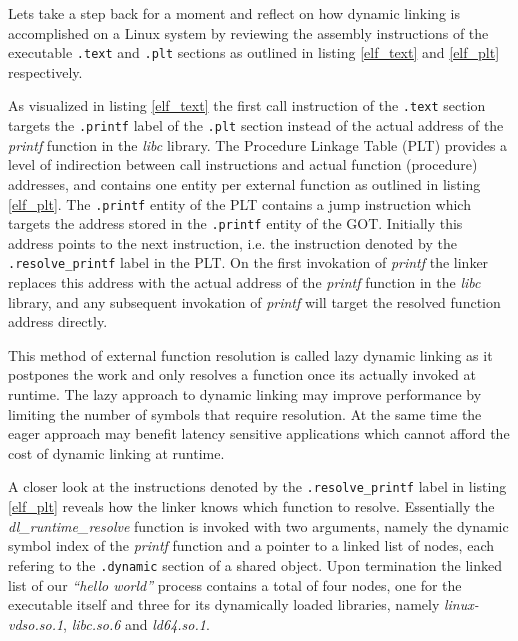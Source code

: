 \documentclass[12pt, a4paper]{article}
\begin{document}
Lets take a step back for a moment and reflect on how dynamic linking is accomplished on a Linux system by reviewing the assembly instructions of the executable \texttt{.text} and \texttt{.plt} sections as outlined in listing \ref{elf_text} and \ref{elf_plt} respectively.





As visualized in listing \ref{elf_text} the first call instruction of the \texttt{.text} section targets the \texttt{.printf} label of the \texttt{.plt} section instead of the actual address of the \textit{printf} function in the \textit{libc} library. The Procedure Linkage Table (PLT) provides a level of indirection between call instructions and actual function (procedure) addresses, and contains one entity per external function as outlined in listing \ref{elf_plt}. The \texttt{.printf} entity of the PLT contains a jump instruction which targets the address stored in the \texttt{.printf} entity of the GOT. Initially this address points to the next instruction, i.e. the instruction denoted by the \texttt{.resolve\_printf} label in the PLT. On the first invokation of \textit{printf} the linker replaces this address with the actual address of the \textit{printf} function in the \textit{libc} library, and any subsequent invokation of \textit{printf} will target the resolved function address directly.

This method of external function resolution is called lazy dynamic linking as it postpones the work and only resolves a function once its actually invoked at runtime. The lazy approach to dynamic linking may improve performance by limiting the number of symbols that require resolution. At the same time the eager approach may benefit latency sensitive applications which cannot afford the cost of dynamic linking at runtime.

A closer look at the instructions denoted by the \texttt{.resolve\_printf} label in listing \ref{elf_plt} reveals how the linker knows which function to resolve. Essentially the \textit{dl\_runtime\_resolve} function is invoked with two arguments, namely the dynamic symbol index of the \textit{printf} function and a pointer to a linked list of nodes, each refering to the \texttt{.dynamic} section of a shared object. Upon termination the linked list of our \textit{``hello world''} process contains a total of four nodes, one for the executable itself and three for its dynamically loaded libraries, namely \textit{linux-vdso.so.1}, \textit{libc.so.6} and \textit{ld64.so.1}.
\end{document}
